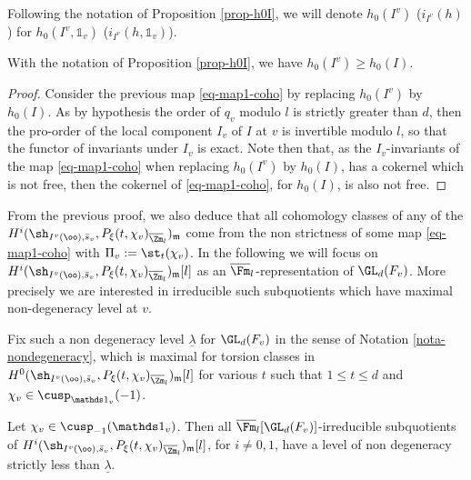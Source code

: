 \begin{nota} \label{nota-h0I}
Following the notation of Proposition \ref{prop-h0I}, we will
denote $h_0(I^v)$ (\resp $i_{I^v}(h)$) for $h_0(I^v,\mathds 1_v)$
(\resp $i_{I^v}(h,\mathds 1_v)$).
\end{nota}

\begin{lemma} \label{lem-iIv}
With the notation of Proposition \ref{prop-h0I}, we have $h_0(I^v) \geq h_0(I)$.
\end{lemma}

\begin{proof}
Consider the previous map \eqref{eq-map1-coho} by replacing $h_0(I^v)$ by $h_0(I)$.
As by hypothesis the order of $q_v$ modulo $l$ is strictly greater than $d$,
then the
pro-order of the local component $I_v$ of $I$ at $v$
is invertible modulo $l$, so that the functor of invariants under $I_v$ is exact.
Note then that, as the $I_v$-invariants of the map \eqref{eq-map1-coho} when
replacing $h_0(I^v)$ by $h_0(I)$, has a cokernel which is not free, then the cokernel
of \eqref{eq-map1-coho}, for $h_0(I)$, is also not free.
\end{proof}

From the previous proof, we also deduce that all cohomology classes of any of
the $H^i(\sh_{I^{v}(\oo),\bar s_v},P_\xi(t,\chi_v)_{\overline \Zm_l})_{\mathfrak m}$ come
from the non strictness of some map \eqref{eq-map1-coho} with $\Pi_v:=\st_t(\chi_v)$. In the following we will focus
on $H^i(\sh_{I^{v}(\oo),\bar s_v},P_\xi(t,\chi_v)_{\overline \Zm_l})_{\mathfrak m}[l]$ as an $\overline \Fm_l$-representation of $\GL_d(F_v)$.
More precisely we are interested in irreducible such subquotients which have
maximal non-degeneracy level at $v$.

\begin{nota}
Fix such a non degeneracy level $\underline{\lambda}$ for $\GL_d(F_v)$
in the sense of Notation \ref{nota-nondegeneracy}, which is maximal for torsion classes
in $H^0(\sh_{I^{v}(\oo),\bar s_v},P_\xi(t,\chi_v)_{\overline \Zm_l})_{\mathfrak m}[l]$ for various $t$ such that $1 \leq t \leq d$ and $\chi_v \in \cusp_{\mathds 1_v}(-1)$.
\end{nota}

\begin{lemma} \label{lem-rem-after1}
Let $\chi_v \in \cusp_{-1}(\mathds 1_v)$.
Then all $\overline \Fm_l[\GL_d(F_v)]$-irreducible subquotients of
$H^i(\sh_{I^{v}(\oo),\bar s_v},P_\xi(t,\chi_v)_{\overline \Zm_l})_{\mathfrak m}[l]$, for $i\neq 0,1$,
have a level of
non degeneracy strictly less than $\underline{\lambda}$.
\end{lemma}

